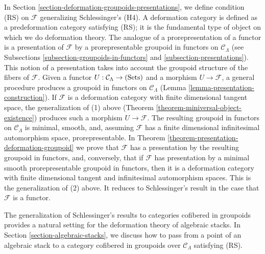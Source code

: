 \medskip \noindent
In Section \ref{section-deformation-groupoids-presentations}, we define 
condition (RS) on $\mathcal F$ generalizing Schlessinger's (H4).  A deformation 
category is defined as a predeformation category satisfying (RS); it is the 
fundamental type of object on which we do deformation theory. The analogue of a 
prorepresentation of a functor is a presentation of $\mathcal F$ by a 
prorepresentable groupoid in functors on $\mathcal C_{\Lambda}$ (see 
Subsections \ref{subsection-groupoids-in-functors} and 
\ref{subsection-presentations}). This notion of a presentation takes into 
account the groupoid structure of the fibers of $\mathcal F$. Given a functor 
$U: \mathcal C_{\Lambda} \rightarrow \textnormal{(Sets)}$ and a morphism $U 
\rightarrow \mathcal F$, a general procedure produces a groupoid in functors on 
$\mathcal C_{\Lambda}$ (Lemma \ref{lemma-presentation-construction}).  If 
$\mathcal F$ is a deformation category with finite dimensional tangent space, 
the generalization of (1) above (Theorem 
\ref{theorem-miniversal-object-existence}) produces such a morphism $U 
\rightarrow \mathcal F$.  The resulting groupoid in functors on $\mathcal 
C_{\Lambda}$ is minimal, smooth, and, assuming $\mathcal F$ has a finite 
dimensional infinitesimal automorphism space, prorepresentable. In Theorem 
\ref{theorem-presentation-deformation-groupoid} we prove that $\mathcal F$ has 
a presentation by the resulting groupoid in functors, and, conversely, that if 
$\mathcal F$ has presentation by a minimal smooth prorepresentable groupoid in 
functors, then it is a deformation category with finite dimensional tangent and 
infinitesimal automorphism spaces. This is the generalization of (2) above. It 
reduces to Schlessinger's result in the case that $\mathcal F$ is a functor.

\medskip \noindent
The generalization of Schlessinger's results to categories cofibered in 
groupoids provides a natural setting for the deformation theory of algebraic 
stacks.  In Section \ref{section-algebraic-stacks}, we discuss how to pass from 
a point of an algebraic stack to a category cofibered in groupoids over 
$\mathcal C_{\Lambda}$ satisfying (RS).

